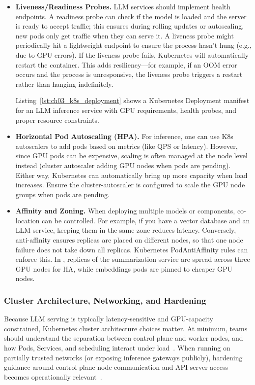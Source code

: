 \begin{itemize}
  \item \textbf{Liveness/Readiness Probes.}  
  LLM services should implement health endpoints. A readiness probe can check if the model is loaded and the server is ready to accept traffic; this ensures during rolling updates or autoscaling, new pods only get traffic when they can serve it. A liveness probe might periodically hit a lightweight endpoint to ensure the process hasn't hung (e.g., due to GPU errors). If the liveness probe fails, Kubernetes will automatically restart the container. This adds resiliency---for example, if an OOM error occurs and the process is unresponsive, the liveness probe triggers a restart rather than hanging indefinitely.

  Listing~\ref{lst:ch03_k8s_deployment} shows a Kubernetes Deployment manifest for an LLM inference service with GPU requirements, health probes, and proper resource constraints.

  \item \textbf{Horizontal Pod Autoscaling (HPA).}  
  For inference, one can use K8s autoscalers to add pods based on metrics (like QPS or latency). However, since GPU pods can be expensive, scaling is often managed at the node level instead (cluster autoscaler adding GPU nodes when pods are pending). Either way, Kubernetes can automatically bring up more capacity when load increases. Ensure the cluster-autoscaler is configured to scale the GPU node groups when pods are pending.

  \item \textbf{Affinity and Zoning.}  
  When deploying multiple models or components, co-location can be controlled. For example, if you have a vector database and an LLM service, keeping them in the same zone reduces latency. Conversely, anti-affinity ensures replicas are placed on different nodes, so that one node failure does not take down all replicas. Kubernetes PodAntiAffinity rules can enforce this. In \ishtar{}, replicas of the summarization service are spread across three GPU nodes for HA, while embeddings pods are pinned to cheaper GPU nodes.
\end{itemize}

\subsubsection{Cluster Architecture, Networking, and Hardening}\label{sec:k8s-arch-hardening}
Because LLM serving is typically latency-sensitive and GPU-capacity constrained, Kubernetes cluster architecture choices matter.
At minimum, teams should understand the separation between control plane and worker nodes, and how Pods, Services, and scheduling interact under load~\cite{k8s_architecture,k8s_components}.
When running on partially trusted networks (or exposing inference gateways publicly), hardening guidance around control plane node communication and API-server access becomes operationally relevant~\cite{k8s_control_plane_comm}.



